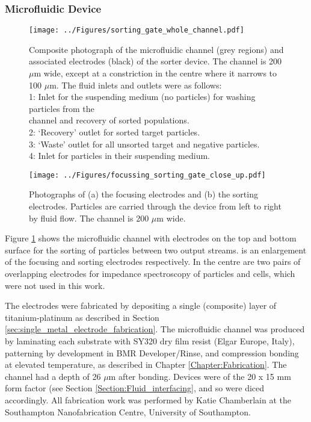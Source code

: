 \subsubsection{Microfluidic Device}

\begin{figure}
 \centering
 \texttt{[image: ../Figures/sorting\_gate\_whole\_channel.pdf]}
 \captionsetup{justification=justified}
 \caption[Composite photograph of the microfluidic channel in the sorting gate device.]{Composite photograph of the microfluidic channel (grey regions) and associated electrodes (black) of the sorter device. The channel is 200 $\mu$m wide, except at a constriction in the centre where it narrows to 100 $\mu$m. The fluid inlets and outlets were as follows: \\
 1: Inlet for the suspending medium (no particles) for washing particles from the \\ \hspace*{0.3cm} channel and recovery of sorted populations.\\
 2: `Recovery' outlet for sorted target particles.\\
 3: `Waste' outlet for all unsorted target and negative particles.\\
 4: Inlet for particles in their suspending medium. 
 }
  
 \label{fig:sorting_gate_whole_channel}
\end{figure}

\begin{figure}
 \centering
 \texttt{[image: ../Figures/focussing\_sorting\_gate\_close\_up.pdf]}
 \caption[The focusing and sorting electrodes in the sorting gate device.]{Photographs of (a) the focusing electrodes and (b) the sorting electrodes. Particles are carried through the device from left to right by fluid flow. The channel is 200 $\mu$m wide.}
 \label{fig:focussing_sorting_gate_close_up}
\end{figure}

Figure \ref{fig:sorting_gate_whole_channel} shows the microfluidic channel with electrodes on the top and bottom surface for the sorting of particles between two output streams.  is an enlargement of the focusing and sorting electrodes respectively. In the centre are two pairs of overlapping electrodes for impedance spectroscopy of particles and cells, which were not used in this work. 

The electrodes were fabricated by depositing a single (composite) layer of titanium-platinum as described in Section \ref{sec:single_metal_electrode_fabrication}. The microfluidic channel was produced by laminating each substrate with SY320 dry film resist (Elgar Europe, Italy), patterning by development in BMR Developer/Rinse, and compression bonding at elevated temperature, as described in Chapter \ref{Chapter:Fabrication}. The channel had a depth of 26 $\mu$m after bonding. Devices were of the 20 x 15 mm form factor (see Section \ref{Section:Fluid_interfacing}, and so were diced accordingly. All fabrication work was performed by Katie Chamberlain at the Southampton Nanofabrication Centre, University of Southampton.

